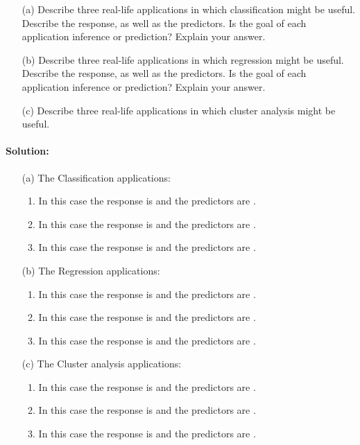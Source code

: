 \documentclass[a4paper,12pt,titlepage]{article} %
\begin{document}
\begin{itemize}
	\item[(a)] Describe three real-life applications in which classification might be useful. Describe the response, as well as the predictors. Is the goal of each application inference or prediction? Explain your answer.
	\item[(b)] Describe three real-life applications in which regression might be useful. Describe the response, as well as the predictors. Is the goal of each application inference or prediction? Explain your answer.
	\item[(c)] Describe three real-life applications in which cluster analysis might be useful.	
\end{itemize}
\paragraph{Solution:}
\begin{itemize}
	\item[(a)] The Classification applications: 
	\begin{enumerate}
		\item In this case the response is and the predictors are .
		\item In this case the response is and the predictors are .
		\item In this case the response is and the predictors are .
	\end{enumerate}
	\item[(b)] The Regression applications: 
	\begin{enumerate}
		\item In this case the response is and the predictors are .
		\item In this case the response is and the predictors are .
		\item In this case the response is and the predictors are .
	\end{enumerate}
	\item[(c)] The Cluster analysis applications: 
	\begin{enumerate}
		\item In this case the response is and the predictors are .
		\item In this case the response is and the predictors are .
		\item In this case the response is and the predictors are .
	\end{enumerate}
\end{itemize}
\end{document}
